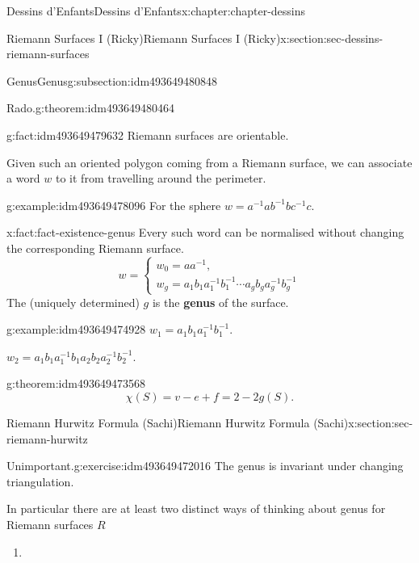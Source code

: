 \documentclass[oneside,10pt,]{book}
\newcommand{\terminology}[1]{\textbf{#1}}
\numberwithin{equation}{section}
\newcommand{\inv}{^{-1}}
\begin{document}
\begin{chapterptx}{Dessins d'Enfants}{}{Dessins d'Enfants}{}{}{x:chapter:chapter-dessins}
\begin{sectionptx}{Riemann Surfaces I (Ricky)}{}{Riemann Surfaces I (Ricky)}{}{}{x:section:sec-dessins-riemann-surfaces}
\begin{subsectionptx}{Genus}{}{Genus}{}{}{g:subsection:idm493649480848}
\begin{theorem}{Rado.}{}{g:theorem:idm493649480464}
\end{theorem}
\begin{fact}{}{}{g:fact:idm493649479632}%
Riemann surfaces are orientable.%
\end{fact}
Given such an oriented polygon coming from a Riemann surface, we can associate a word \(w\) to it from travelling around the perimeter.%
\begin{example}{}{g:example:idm493649478096}%
For the sphere \(w = a\inv ab\inv bc\inv c\).%
\end{example}
\begin{fact}{}{}{x:fact:fact-existence-genus}%
Every such word can be normalised without changing the corresponding Riemann surface.%
\begin{equation*}
w = \begin{cases} w_0 = aa\inv,\\ w_g = a_1b_1 a_1\inv b_1\inv \cdots a_gb_g a_g\inv b_g\inv\end{cases}
\end{equation*}
The (uniquely determined) \(g\) is the \terminology{genus} of the surface.%
\end{fact}
\begin{example}{}{g:example:idm493649474928}%
\(w_1 = a_1b_1 a_1\inv b_1 \inv\).%
\par
\(w_2 = a_1b_1 a_1\inv b_1a_2b_2 a_2\inv b_2 \inv\).%
\end{example}
\begin{theorem}{}{}{g:theorem:idm493649473568}%
%
\begin{equation*}
\chi (S) = v- e + f = 2-2g(S)\text{.}
\end{equation*}
%
\end{theorem}
\end{subsectionptx}
\end{sectionptx}
%
%
\typeout{************************************************}
\typeout{************************************************}
%
\begin{sectionptx}{Riemann Hurwitz Formula (Sachi)}{}{Riemann Hurwitz Formula (Sachi)}{}{}{x:section:sec-riemann-hurwitz}
\begin{inlineexercise}{Unimportant.}{g:exercise:idm493649472016}%
The genus is invariant under changing triangulation.%
\end{inlineexercise}
In particular there are at least two distinct ways of thinking about genus for Riemann surfaces \(R\)%
\begin{enumerate}
\item{}%

\end{enumerate}
\end{sectionptx}
\end{chapterptx}
\end{document}
